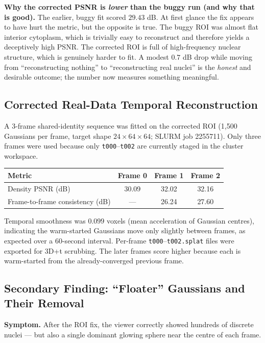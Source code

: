 \documentclass[11pt,a4paper]{article}
\newcommand{\code}[1]{\texttt{#1}}
\begin{document}
\textbf{Why the corrected PSNR is \emph{lower} than the buggy run (and why that is good).}
The earlier, buggy fit scored \(29.43\) dB. At first glance the fix appears to have hurt
the metric, but the opposite is true. The buggy ROI was almost flat interior cytoplasm,
which is trivially easy to reconstruct and therefore yields a deceptively high PSNR. The
corrected ROI is full of high-frequency nuclear structure, which is genuinely harder to
fit. A modest \(0.7\) dB drop while moving from ``reconstructing nothing'' to
``reconstructing real nuclei'' is the \emph{honest} and desirable outcome; the number now
measures something meaningful.

\subsection{Corrected Real-Data Temporal Reconstruction}

A 3-frame shared-identity sequence was fitted on the corrected ROI (1{,}500 Gaussians per
frame, target shape \(24\times64\times64\); SLURM job 2255711). Only three frames were
used because only \code{t000}--\code{t002} are currently staged in the cluster workspace.

\begin{table}[h!]
\centering
\small
\begin{tabular}{@{}lccc@{}}
\toprule
\textbf{Metric} & \textbf{Frame 0} & \textbf{Frame 1} & \textbf{Frame 2} \\
\midrule
Density PSNR (dB)            & 30.09 & 32.02 & 32.16 \\
Frame-to-frame consistency (dB) & --- & 26.24 & 27.60 \\
\bottomrule
\end{tabular}
\end{table}

Temporal smoothness was \(0.099\) voxels (mean acceleration of Gaussian centres),
indicating the warm-started Gaussians move only slightly between frames, as expected over
a 60-second interval. Per-frame \code{t000}--\code{t002.splat} files were exported for
3D+t scrubbing. The later frames score higher because each is warm-started from the
already-converged previous frame.

\subsection{Secondary Finding: ``Floater'' Gaussians and Their Removal}
\label{sec:floaters}

\textbf{Symptom.}
After the ROI fix, the viewer correctly showed hundreds of discrete nuclei --- but also a
single dominant glowing sphere near the centre of each frame.
\end{document}
